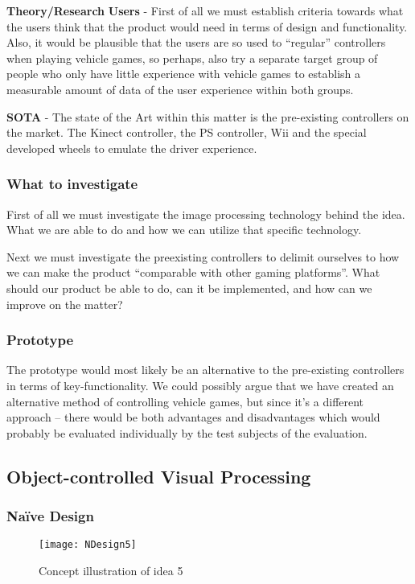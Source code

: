 \noindent\textbf{Theory/Research}\newline
\noindent\textbf{Users} - First of all we must establish criteria towards what the users think that the product would need in terms of design and functionality. Also, it would be plausible that the users are so used to “regular” controllers when playing vehicle games, so perhaps, also try a separate target group of people who only have little experience with vehicle games to establish a measurable amount of data of the user experience within both groups.
\bigskip

\noindent\textbf{SOTA} - The state of the Art within this matter is the pre-existing controllers on the market. The Kinect controller, the PS controller, Wii and the special developed wheels to emulate the driver experience.

\subsubsection*{What to investigate}
First of all we must investigate the image processing technology behind the idea. What we are able to do and how we can utilize that specific technology.

Next we must investigate the preexisting controllers to delimit ourselves to how we can make the product “comparable with other gaming platforms”. What should our product be able to do, can it be implemented, and how can we improve on the matter?

\subsubsection*{Prototype}
The prototype would most likely be an alternative to the pre-existing controllers in terms of key-functionality. We could possibly argue that we have created an alternative method of controlling vehicle games, but since it’s a different approach – there would be both advantages and disadvantages which would probably be evaluated individually by the test subjects of the evaluation.
\pagebreak

\subsection{Object-controlled Visual Processing} \label{nd5}
\subsubsection*{Naïve Design}
\begin{figure}[h]
\centering
\texttt{[image: NDesign5]}
\caption{Concept illustration of idea 5}
\label{fig:ndesign5}
\end{figure}

